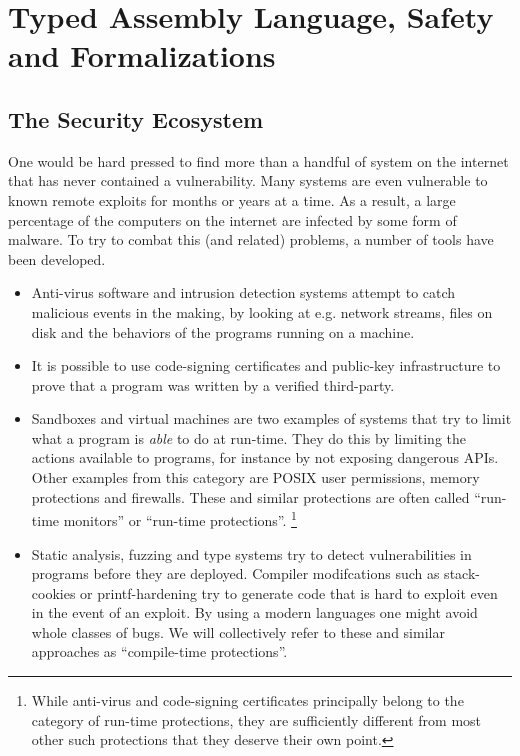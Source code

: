 \chapter{Typed Assembly Language, Safety and Formalizations}
\label{chap:introduction}

\section{The Security Ecosystem}
One would be hard pressed to find more than a handful of system on the internet
that has never contained a vulnerability. Many systems are even vulnerable to
known remote exploits for months or years at a time. As a result, a large
percentage of the computers on the internet are infected by some form of
malware. To try to combat this (and related) problems, a number of tools have
been developed.

\begin{itemize}
\item Anti-virus software and intrusion detection systems attempt to catch
  malicious events in the making, by looking at e.g. network streams, files on
  disk and the behaviors of the programs running on a machine.
\item It is possible to use code-signing certificates and public-key
  infrastructure to prove that a program was written by a verified third-party.
\item Sandboxes and virtual machines are two examples of systems that try to
  limit what a program is \emph{able} to do at run-time. They do this by
  limiting the actions available to programs, for instance by not exposing
  dangerous APIs. Other examples from this category are POSIX user
  permissions\cite{posix}, memory protections\cite{intelsys} and
  firewalls. These and similar protections are often called ``run-time
  monitors'' or ``run-time protections''.  \footnote{While anti-virus and
    code-signing certificates principally belong to the category of run-time
    protections, they are sufficiently different from most other such
    protections that they deserve their own point.}
\item Static analysis, fuzzing and type systems try to detect vulnerabilities in
  programs before they are deployed. Compiler modifcations such as stack-cookies
  or printf-hardening try to generate code that is hard to exploit even in the
  event of an exploit. By using a modern languages one might avoid whole classes
  of bugs. We will collectively refer to these and similar approaches as
  ``compile-time protections''.
\end{itemize}


